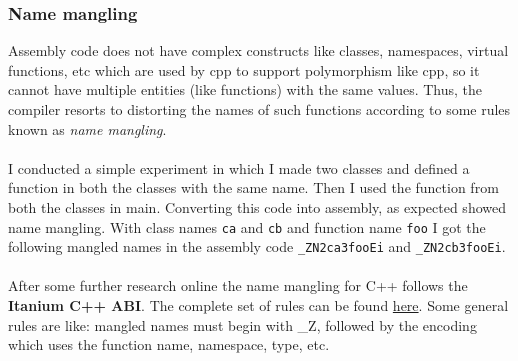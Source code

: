 \documentclass[12pt]{article}
\newcommand{\code}{\texttt}
\begin{document}
\subsubsection{Name mangling}
Assembly code does not have complex constructs like classes, namespaces, virtual functions, etc which are used by cpp to support polymorphism like cpp, so it cannot have multiple entities (like functions) with the same values. Thus, the compiler resorts to distorting the names of such functions according to some rules known as \textit{name mangling}.\\~\\
I conducted a simple experiment in which I made two classes and defined a function in both the classes with the same name. Then I used the function from both the classes in main. Converting this code into assembly, as expected showed name mangling. With class names \code{ca} and \code{cb} and function name \code{foo} I got the following mangled names in the assembly code \code{\_ZN2ca3fooEi} and \code{\_ZN2cb3fooEi}.\\~\\
After some further research online the name mangling for C++ follows the \textbf{Itanium C++ ABI}. The complete set of rules can be found \href{https://itanium-cxx-abi.github.io/cxx-abi/abi.html#mangling}{here}. Some general rules are like: mangled names must begin with \_Z, followed by the encoding which uses the function name, namespace, type, etc.
\newpage
\end{document}
